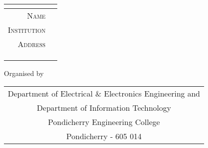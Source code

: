 \begin{titlepage}
  \begin{center}
  \bfseries\large
  \renewcommand{\arraystretch}{1.3}
  \begin{tabularx}{\textwidth}{r!{:}X}
     \\\toprule[1pt]
    \scshape Name            & \mbox{}         \\ 
    \scshape Institution     & \mbox{}         \\ 
    \scshape Address         & \mbox{}         \\ 
     \\ 
     \\ 
     \\\bottomrule[1pt]
  \end{tabularx}
  \end{center}

  \noindent
  \begin{minipage}{\textwidth}
    \centering\color{Olive}
    \Large\normalfont Organised by

    \vspace{5mm}\large\color{other}%
    \begin{tabular}{c}
      Department of Electrical \& Electronics Engineering and \\
      Department of Information Technology \\
      Pondicherry Engineering College \\
      Pondicherry - 605 014
    \end{tabular}
  \end{minipage}

\end{titlepage}

